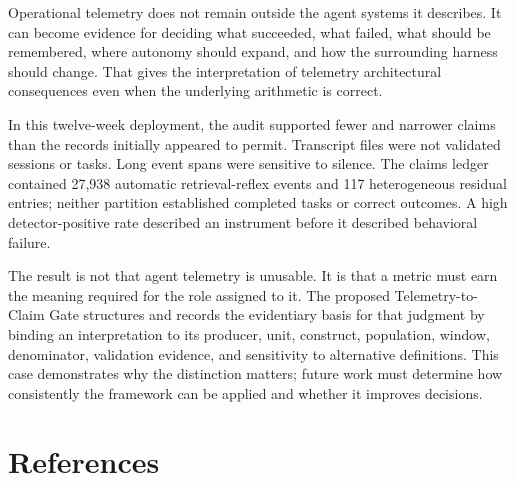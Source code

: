 \documentclass[12pt]{article}
\begin{document}
Operational telemetry does not remain outside the agent systems it describes. It can become evidence for deciding what succeeded, what failed, what should be remembered, where autonomy should expand, and how the surrounding harness should change. That gives the interpretation of telemetry architectural consequences even when the underlying arithmetic is correct.

In this twelve-week deployment, the audit supported fewer and narrower claims than the records initially appeared to permit. Transcript files were not validated sessions or tasks. Long event spans were sensitive to silence. The claims ledger contained 27,938 automatic retrieval-reflex events and 117 heterogeneous residual entries; neither partition established completed tasks or correct outcomes. A high detector-positive rate described an instrument before it described behavioral failure.

The result is not that agent telemetry is unusable. It is that a metric must earn the meaning required for the role assigned to it. The proposed Telemetry-to-Claim Gate structures and records the evidentiary basis for that judgment by binding an interpretation to its producer, unit, construct, population, window, denominator, validation evidence, and sensitivity to alternative definitions. This case demonstrates why the distinction matters; future work must determine how consistently the framework can be applied and whether it improves decisions.

\section{References}\label{references}
\end{document}
